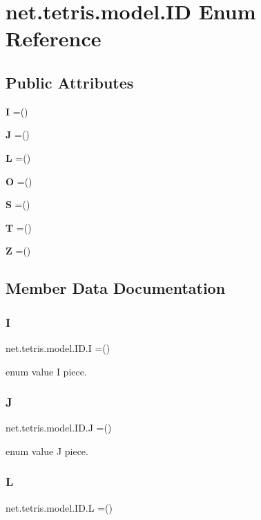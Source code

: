 \section{net.\+tetris.\+model.\+ID Enum Reference}
\label{enumnet_1_1tetris_1_1model_1_1_i_d}
\subsection*{Public Attributes}
\begin{DoxyCompactItemize}
\item 
{\bf I} =()
\item 
{\bf J} =()
\item 
{\bf L} =()
\item 
{\bf O} =()
\item 
{\bf S} =()
\item 
{\bf T} =()
\item 
{\bf Z} =()
\end{DoxyCompactItemize}


\subsection{Member Data Documentation}
\label{enumnet_1_1tetris_1_1model_1_1_i_d_a10be3ac10ae505d6c8b98940f9d817ce} 
\subsubsection{I}
{\footnotesize\ttfamily net.\+tetris.\+model.\+I\+D.\+I =()}

enum value I piece. \label{enumnet_1_1tetris_1_1model_1_1_i_d_a5023b281a6f04097ae28ab1da6d18f60} 
\subsubsection{J}
{\footnotesize\ttfamily net.\+tetris.\+model.\+I\+D.\+J =()}

enum value J piece. \label{enumnet_1_1tetris_1_1model_1_1_i_d_a47de2d85cc6670718ac073178b8ed35f} 
\subsubsection{L}
{\footnotesize\ttfamily net.\+tetris.\+model.\+I\+D.\+L =()}

